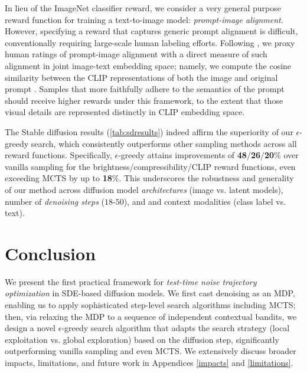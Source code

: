 \documentclass{article}
\begin{document}
%
%
In lieu of the ImageNet classifier reward, we consider a very general purpose reward function for training a text-to-image model: \textit{prompt-image alignment}. However, specifying a reward that captures generic prompt alignment is difficult, conventionally requiring large-scale human labeling efforts. Following \citet{ma2025inferencetimescalingdiffusionmodels}, we proxy human ratings of prompt-image alignment with a direct measure of such alignment in joint image-text embedding space; namely, we compute the cosine similarity between the CLIP representations of both the image and original prompt \citep{radford2021learningtransferablevisualmodels}. Samples
that more faithfully adhere to the semantics of the prompt should receive higher rewards under this framework, to the extent that
those visual details are represented distinctly in CLIP embedding space. 


%
The Stable diffusion results (\autoref{tab:sdresults}) indeed affirm the superiority of our $\epsilon$-greedy search, which consistently outperforms other sampling methods across all reward functions. Specifically, $\epsilon$-greedy attains improvements of \textbf{48}/\textbf{26}/\textbf{20}$\%$ over vanilla sampling for the brightness/compressibility/CLIP reward functions, even exceeding MCTS by up to \textbf{18}$\%$. This underscores the robustness and generality
of our method across
diffusion model \textit{architectures} (image vs. latent models), number of \textit{denoising steps} ($18$-$50$), and
and context modalities (class label vs. text).




\section{Conclusion}
\label{conc}
%
We present the first practical framework for \emph{test-time noise trajectory optimization} in SDE-based diffusion models. We first cast denoising as an MDP, enabling us to apply sophisticated step-level search algorithms including MCTS; then, via relaxing the MDP to a sequence of independent contextual bandits, we design a novel $\epsilon$-greedy search algorithm that adapts the search strategy (local exploitation vs. global exploration) based on the diffusion step, significantly outperforming vanilla sampling and even MCTS. We extensively discuss broader impacts, limitations, and future work in Appendices \ref{impacts} and \ref{limitations}.
\end{document}
